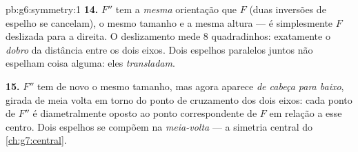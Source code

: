 \begin{solution}{pb:g6:symmetry:1}
\textbf{14.} $F''$ tem a \emph{mesma} orientação que $F$ (duas
inversões de espelho se cancelam), o mesmo tamanho e a mesma altura ---
é simplesmente $F$ deslizada para a direita. O deslizamento mede $8$
quadradinhos: exatamente o \emph{dobro} da distância entre os dois
eixos. Dois espelhos paralelos juntos não espelham coisa alguma: eles
\emph{transladam}.

\textbf{15.} $F''$ tem de novo o mesmo tamanho, mas agora aparece
\emph{de cabeça para baixo}, girada de meia volta em torno do ponto de
cruzamento dos dois eixos: cada ponto de $F''$ é diametralmente oposto
ao ponto correspondente de $F$ em relação a esse centro. Dois espelhos
 se compõem na \emph{meia-volta} --- a simetria central
do \cref{ch:g7:central}.
\end{solution}
